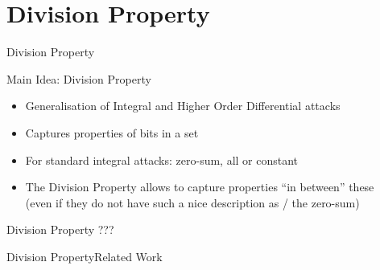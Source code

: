 \section{Division Property}
\begin{frame}[plain]
    \sectionpage
    \vfill
\end{frame}

\begin{frame}{Division Property}
    \begin{block}{Main Idea: Division Property}
        \begin{itemize}
            \item Generalisation of Integral and Higher Order Differential attacks
            \item Captures properties of bits in a set
            \item For standard integral attacks: zero-sum, all or constant
            \item The Division Property allows to capture properties \enquote{in between} these\\
                  (even if they do not have such a nice description as \eg/ the zero-sum)
        \end{itemize}
    \end{block}
    \begin{block}{Division Property}
        ???
    \end{block}
\end{frame}

\begin{frame}{Division Property}{Related Work}
    \begin{timeline}
    \end{timeline}
\end{frame}

